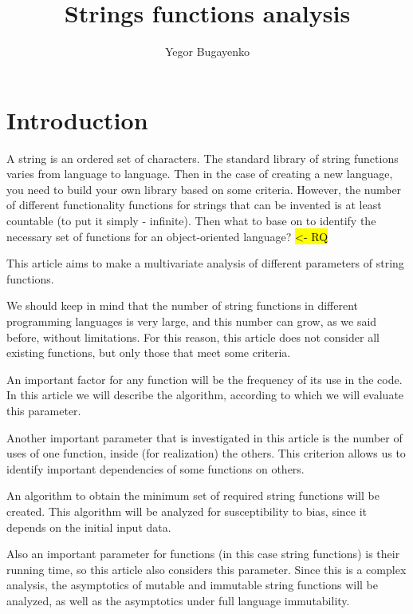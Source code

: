 \documentclass[anonymous,sigplan,review,11pt,nonacm,natbib=false]{acmart}
\title{Strings functions analysis}
\author{Yegor Bugayenko}
\affiliation{Huawei\city{Moscow}\country{Russia}}
\begin{document}
    \raggedbottom

    \begin{abstract}
    \end{abstract}

    \maketitle

    \section{Introduction}\label{sec:intro}

    A string is an ordered set of characters. The standard library of string functions varies from language to language. Then in the case of creating a new language, you need to build your own library based on some criteria. However, the number of different functionality functions for strings that can be invented is at least countable (to put it simply - infinite). Then what to base on to identify the necessary set of functions for an object-oriented language? \hl{<- RQ}

    This article aims to make a multivariate analysis of different parameters of string functions.

    We should keep in mind that the number of string functions in different programming languages is very large, and this number can grow, as we said before, without limitations. For this reason, this article does not consider all existing functions, but only those that meet some criteria.

    An important factor for any function will be the frequency of its use in the code. In this article we will describe the algorithm, according to which we will evaluate this parameter.

    Another important parameter that is investigated in this article is the number of uses of one function, inside (for realization) the others. This criterion allows us to identify important dependencies of some functions on others.

    An algorithm to obtain the minimum set of required string functions will be created. This algorithm will be analyzed for susceptibility to bias, since it depends on the initial input data.

    Also an important parameter for functions (in this case string functions) is their running time, so this article also considers this parameter. Since this is a complex analysis, the asymptotics of mutable and immutable string functions will be analyzed, as well as the asymptotics under full language immutability.
\end{document}
